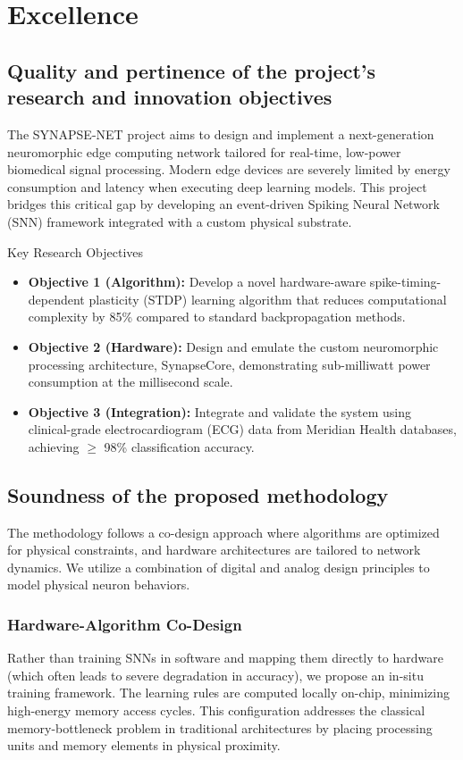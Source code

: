 \section{Excellence}
\subsection{Quality and pertinence of the project's research and innovation objectives}
The SYNAPSE-NET project aims to design and implement a next-generation neuromorphic edge computing network tailored for real-time, low-power biomedical signal processing. Modern edge devices are severely limited by energy consumption and latency when executing deep learning models. This project bridges this critical gap by developing an event-driven Spiking Neural Network (SNN) framework integrated with a custom physical substrate.

\vspace{0.4cm}
\begin{mscabox}{Key Research Objectives}
\begin{itemize}[leftmargin=*]
  \item \textbf{Objective 1 (Algorithm):} Develop a novel hardware-aware spike-timing-dependent plasticity (STDP) learning algorithm that reduces computational complexity by 85\% compared to standard backpropagation methods.
  \item \textbf{Objective 2 (Hardware):} Design and emulate the custom neuromorphic processing architecture, SynapseCore, demonstrating sub-milliwatt power consumption at the millisecond scale.
  \item \textbf{Objective 3 (Integration):} Integrate and validate the system using clinical-grade electrocardiogram (ECG) data from Meridian Health databases, achieving $\ge$ 98\% classification accuracy.
\end{itemize}
\end{mscabox}
\vspace{0.2cm}

\subsection{Soundness of the proposed methodology}
The methodology follows a co-design approach where algorithms are optimized for physical constraints, and hardware architectures are tailored to network dynamics. We utilize a combination of digital and analog design principles to model physical neuron behaviors.

\subsubsection{Hardware-Algorithm Co-Design}
Rather than training SNNs in software and mapping them directly to hardware (which often leads to severe degradation in accuracy), we propose an in-situ training framework. The learning rules are computed locally on-chip, minimizing high-energy memory access cycles. This configuration addresses the classical memory-bottleneck problem in traditional architectures by placing processing units and memory elements in physical proximity.


